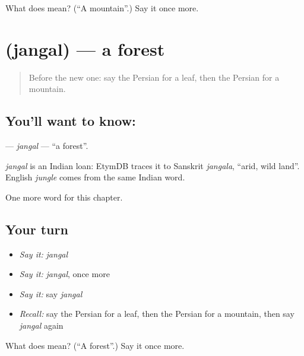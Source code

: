 \begin{tcolorbox}[breakable,colback=teal!4,colframe=teal!35!black,title={Before you move on}]
What does  mean? (\textquotedblleft{}A mountain\textquotedblright{}.) Say it once more.
\end{tcolorbox}
\section[\texorpdfstring{\fa{جنگل} (jangal)}{جنگل (jangal)}]{ (jangal) — a forest}

\label{lesson:FA-C52-jangal}



\begin{quote}
Before the new one: say the Persian for a leaf, then the Persian for a mountain.
\end{quote}

\subsection*{You'll want to know: }
\textbf{} — \emph{jangal} — \textquotedblleft{}a forest\textquotedblright{}.

\begin{cousinweb}
\emph{jangal} is an Indian loan: EtymDB traces it to Sanskrit \emph{jangala}, \textquotedblleft{}arid, wild land\textquotedblright{}. English \emph{jungle} comes from the same Indian word.
\end{cousinweb}

\begin{grammarlens}[title={What you've built}]
One more word for this chapter.
\end{grammarlens}

\subsection*{Your turn}
\begin{itemize}
\raggedright
  \item \emph{Say it:} \emph{jangal}
  \item \emph{Say it:} \emph{jangal}, once more
  \item \emph{Say it:} say \emph{jangal}
  \item \emph{Recall:} say the Persian for a leaf, then the Persian for a mountain, then say \emph{jangal} again
\end{itemize}

\begin{tcolorbox}[breakable,colback=teal!4,colframe=teal!35!black,title={Before you move on}]
What does  mean? (\textquotedblleft{}A forest\textquotedblright{}.) Say it once more.
\end{tcolorbox}
